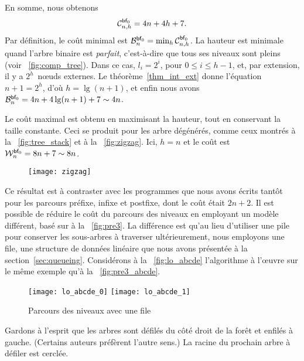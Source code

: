 En somme, nous obtenons
\begin{equation*}
\C{\fun{bf}_0}{n,h} = 4n + 4h + 7. \index{bf0@$\C{\fun{bf}_0}{n,h}$}
\end{equation*}
Par définition, le coût minimal est \(\B{\fun{bf}_0}{n} =
\min_h\C{\fun{bf}_0}{n,h}\). La hauteur
est minimale quand l'arbre binaire est \emph{parfait}, c'est-à-dire que tous ses niveaux sont
pleins (voir \fig~\vref{fig:comp_tree}). Dans ce cas, \(l_i=2^i\),
pour \(0 \leqslant i \leqslant h-1\), et, par extension, il y a
\(2^h\)~nœuds externes. Le théorème~\ref{thm_int_ext} donne
l'équation \(n+1 = 2^h\), d'où \(h=\lg(n+1)\), et enfin nous avons
\(\B{\fun{bf}_0}{n} = 4n + 4\lg(n+1) + 7 \sim
4n\). 

Le coût maximal est obtenu en maximisant la hauteur, tout en conservant la taille constante. Ceci se
produit pour les arbre dégénérés,
comme ceux montrés à la \fig~\vref{fig:tree_stack} et à la
\fig~\vref{fig:zigzag}. Ici, \(h=n\) et le coût est
\(\W{\fun{bf}_0}{n} = 8n + 7 \sim
8n\). 

%
\begin{wrapfigure}[7]{r}[0pt]{0pt}
\centering
\texttt{[image: zigzag]}
\caption{}
\label{fig:zigzag}
\end{wrapfigure}
Ce résultat est à contraster avec les programmes que nous avons écrits
tantôt pour les parcours préfixe, infixe et postfixe, dont le coût
était \(2n+2\). Il est possible de réduire le coût du parcours des
niveaux en employant un modèle différent, basé sur
 à la
\fig~\vref{fig:pre3}. La différence est qu'au lieu d'utiliser une pile
pour conserver les sous-arbres à traverser ultérieurement, nous
employons une file, une structure de données linéaire que
nous avons présentée à la section~\ref{sec:queueing}. Considérons à la
\fig~\vref{fig:lo_abcde} l'algorithme à l'œuvre sur le même
exemple qu'à la \fig~\vref{fig:pre3_abcde}.
\begin{figure}[b]
\centering
\texttt{[image: lo\_abcde\_0]}
\bigskip
\texttt{[image: lo\_abcde\_1]}
\caption{Parcours des niveaux avec une file}
\label{fig:lo_abcde}
\end{figure}
Gardons à l'esprit que les arbres sont défilés du côté droit de la
forêt et enfilés à gauche. (Certains auteurs préfèrent l'autre sens.)
La racine du prochain arbre à défiler est cerclée.

